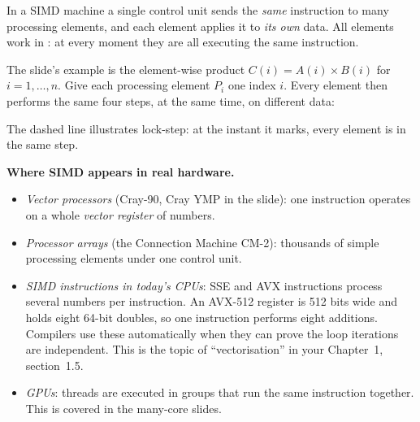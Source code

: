In a SIMD machine a single control unit sends the \emph{same} instruction to many processing elements,
and each element applies it to \emph{its own} data. All elements work in : at every moment they are
all executing the same instruction.

The slide's example is the element-wise product $C(i)=A(i)\times B(i)$ for $i=1,\dots,n$.
Give each processing element $P_i$ one index $i$. Every element then performs the same four steps, at the
same time, on different data:

\begin{center}
\end{center}

The dashed line illustrates lock-step: at the instant it marks, every element is in the same step.

\textbf{Where SIMD appears in real hardware.}
\begin{itemize}
  \item \emph{Vector processors} (Cray-90, Cray YMP in the slide): one instruction operates on a whole
        \emph{vector register} of numbers.
  \item \emph{Processor arrays} (the Connection Machine CM-2): thousands of simple processing
        elements under one control unit.
  \item \emph{SIMD instructions in today's CPUs}: SSE and AVX instructions process several numbers per
        instruction. An AVX-512 register is 512 bits wide and holds eight 64-bit doubles, so one instruction
        performs eight additions. Compilers use these automatically when they can prove the loop iterations
        are independent. This is the topic of ``vectorisation'' in your Chapter~1, section~1.5.
  \item \emph{GPUs}: threads are executed in groups that run the same instruction together. This is covered in the many-core
        slides.
\end{itemize}

